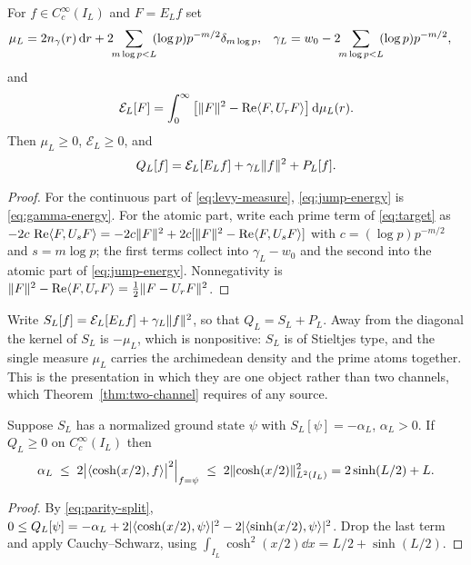 \begin{proposition}\label{prop:jump}
For $f\in C_c^\infty(I_L)$ and $F=E_Lf$ set
\begin{align}
 \mu_L&=2\gammak(r)\dd r
  +2\!\!\sum_{m\log p<L}\!\!(\log p)p^{-m/2}\delta_{m\log p},
 &\gamma_L&=w_0-2\!\!\sum_{m\log p<L}\!\!(\log p)p^{-m/2},
 \label{eq:levy-measure}
\end{align}
and
\begin{equation}\label{eq:jump-energy}
 \mathcal E_L[F]=\int_0^\infty\big[\lVert F\rVert^2-\operatorname{Re}\langle F,U_rF\rangle\big]\,\mathrm d\mu_L(r).
\end{equation}
Then $\mu_L\geq0$, $\mathcal E_L\geq0$, and
\begin{equation}\label{eq:jump-decomposition}
 Q_L[f]=\mathcal E_L[E_Lf]+\gamma_L\lVert f\rVert^2+P_L[f].
\end{equation}
\end{proposition}
\begin{proof}
For the continuous part of \eqref{eq:levy-measure}, \eqref{eq:jump-energy} is
\eqref{eq:gamma-energy}. For the atomic part, write each prime term of
\eqref{eq:target} as
$-2c\,\operatorname{Re}\langle F,U_sF\rangle=-2c\lVert F\rVert^2+2c[\lVert F\rVert^2-\operatorname{Re}\langle F,U_sF\rangle]$ with
$c=(\log p)p^{-m/2}$ and $s=m\log p$; the first terms collect into
$\gamma_L-w_0$ and the second into the atomic part of \eqref{eq:jump-energy}.
Nonnegativity is $\lVert F\rVert^2-\operatorname{Re}\langle F,U_rF\rangle=\tfrac12\lVert F-U_rF\rVert^2$.
\end{proof}

Write $S_L[f]=\mathcal E_L[E_Lf]+\gamma_L\lVert f\rVert^2$, so that $Q_L=S_L+P_L$.
Away from the diagonal the kernel of $S_L$ is $-\mu_L$, which is nonpositive:
$S_L$ is of Stieltjes type, and the single measure $\mu_L$ carries the
archimedean density and the prime atoms together. This is the presentation in
which they are one object rather than two channels, which
Theorem~\ref{thm:two-channel} requires of any source.

\begin{proposition}\label{prop:necessary}
Suppose $S_L$ has a normalized ground state $\psi$ with $S_L[\psi]=-\alpha_L$,
$\alpha_L>0$. If $Q_L\geq0$ on $C_c^\infty(I_L)$ then
\begin{equation}\label{eq:necessary}
 \alpha_L\;\leq\;2\big|\langle \cosh(x/2),f\rangle\big|^2\Big|_{f=\psi}\;\leq\;
 2\lVert \cosh(x/2)\rVert^2_{L^2(I_L)}=2\sinh(L/2)+L.
\end{equation}
\end{proposition}
\begin{proof}
By \eqref{eq:parity-split},
$0\leq Q_L[\psi]=-\alpha_L+2|\langle \cosh(x/2),\psi\rangle|^2-2|\langle \sinh(x/2),\psi\rangle|^2$.
Drop the last term and apply Cauchy--Schwarz, using
$\int_{I_L}\cosh^2(x/2)\dd x=L/2+\sinh(L/2)$.
\end{proof}

